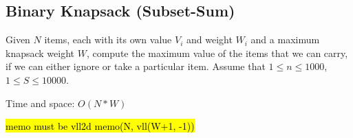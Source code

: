 \subsection{Binary Knapsack (Subset-Sum)}

Given $N$ items, each with its own value $V_i$ and weight $W_i$ and a maximum knapsack weight $W$, compute the maximum value of the items that we can carry, if we can either ignore or take a particular item. Assume that $1 \leq n \leq 1000$, $1 \leq S \leq 10 000$.

Time and space: $O(N*W)$

\hl{memo must be vll2d memo(N, vll(W+1, -1))}

